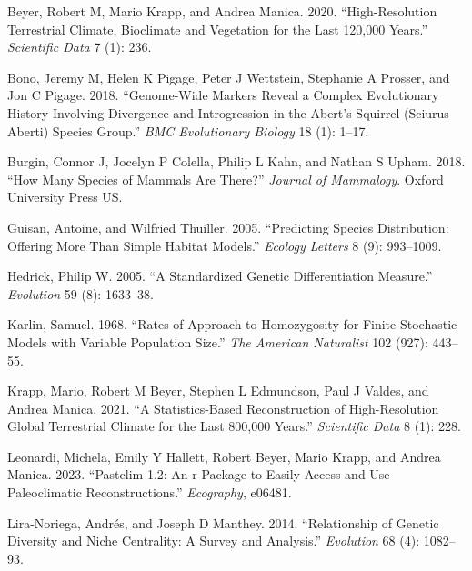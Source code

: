 \documentclass[
]{article}
\newlength{\cslhangindent}
\newlength{\cslentryspacingunit} %
\newenvironment{CSLReferences}[2] %
 {%
  \setlength{\parindent}{0pt}
  \ifodd #1
  \let\oldpar\par
  \def\par{\hangindent=\cslhangindent\oldpar}
  \fi
  \setlength{\parskip}{#2\cslentryspacingunit}
 }%
 {}
\begin{document}
\hypertarget{refs}{}
\begin{CSLReferences}{1}{0}
\leavevmode{}%
Beyer, Robert M, Mario Krapp, and Andrea Manica. 2020.
{``High-Resolution Terrestrial Climate, Bioclimate and Vegetation for
the Last 120,000 Years.''} \emph{Scientific Data} 7 (1): 236.

\leavevmode{}%
Bono, Jeremy M, Helen K Pigage, Peter J Wettstein, Stephanie A Prosser,
and Jon C Pigage. 2018. {``Genome-Wide Markers Reveal a Complex
Evolutionary History Involving Divergence and Introgression in the
Abert's Squirrel (Sciurus Aberti) Species Group.''} \emph{BMC
Evolutionary Biology} 18 (1): 1--17.

\leavevmode{}%
Burgin, Connor J, Jocelyn P Colella, Philip L Kahn, and Nathan S Upham.
2018. {``How Many Species of Mammals Are There?''} \emph{Journal of
Mammalogy}. Oxford University Press US.

\leavevmode{}%
Guisan, Antoine, and Wilfried Thuiller. 2005. {``Predicting Species
Distribution: Offering More Than Simple Habitat Models.''} \emph{Ecology
Letters} 8 (9): 993--1009.

\leavevmode{}%
Hedrick, Philip W. 2005. {``A Standardized Genetic Differentiation
Measure.''} \emph{Evolution} 59 (8): 1633--38.

\leavevmode{}%
Karlin, Samuel. 1968. {``Rates of Approach to Homozygosity for Finite
Stochastic Models with Variable Population Size.''} \emph{The American
Naturalist} 102 (927): 443--55.

\leavevmode{}%
Krapp, Mario, Robert M Beyer, Stephen L Edmundson, Paul J Valdes, and
Andrea Manica. 2021. {``A Statistics-Based Reconstruction of
High-Resolution Global Terrestrial Climate for the Last 800,000
Years.''} \emph{Scientific Data} 8 (1): 228.

\leavevmode{}%
Leonardi, Michela, Emily Y Hallett, Robert Beyer, Mario Krapp, and
Andrea Manica. 2023. {``Pastclim 1.2: An r Package to Easily Access and
Use Paleoclimatic Reconstructions.''} \emph{Ecography}, e06481.

\leavevmode{}%
Lira-Noriega, Andrés, and Joseph D Manthey. 2014. {``Relationship of
Genetic Diversity and Niche Centrality: A Survey and Analysis.''}
\emph{Evolution} 68 (4): 1082--93.


\end{CSLReferences}
\end{document}
